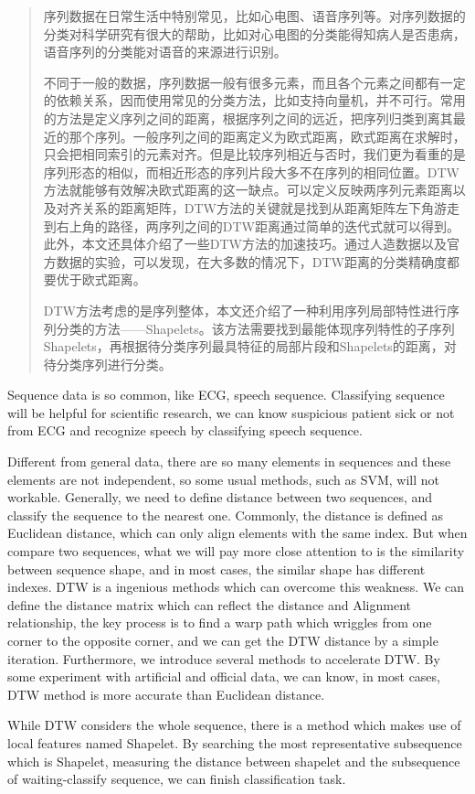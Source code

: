 \begin{abstract}

    序列数据在日常生活中特别常见，比如心电图、语音序列等。对序列数据的分类对科学研究有很大的帮助，比如对心电图的分类能得知病人是否患病，语音序列的分类能对语音的来源进行识别。

    不同于一般的数据，序列数据一般有很多元素，而且各个元素之间都有一定的依赖关系，因而使用常见的分类方法，比如支持向量机，并不可行。常用的方法是定义序列之间的距离，根据序列之间的远近，把序列归类到离其最近的那个序列。一般序列之间的距离定义为欧式距离，欧式距离在求解时，只会把相同索引的元素对齐。但是比较序列相近与否时，我们更为看重的是序列形态的相似，而相近形态的序列片段大多不在序列的相同位置。DTW方法就能够有效解决欧式距离的这一缺点。可以定义反映两序列元素距离以及对齐关系的距离矩阵，DTW方法的关键就是找到从距离矩阵左下角游走到右上角的路径，两序列之间的DTW距离通过简单的迭代式就可以得到。此外，本文还具体介绍了一些DTW方法的加速技巧。通过人造数据以及官方数据的实验，可以发现，在大多数的情况下，DTW距离的分类精确度都要优于欧式距离。

    DTW方法考虑的是序列整体，本文还介绍了一种利用序列局部特性进行序列分类的方法——Shapelets。该方法需要找到最能体现序列特性的子序列Shapelets，再根据待分类序列最具特征的局部片段和Shapelets的距离，对待分类序列进行分类。

\end{abstract}

\begin{enabstract}
  Sequence data is so common, like ECG, speech sequence. Classifying sequence will be helpful for scientific research, we can know suspicious patient sick or not from ECG and recognize speech by classifying speech sequence.

  Different from general data, there are so many elements in sequences and these elements are not independent, so some usual methods, such as SVM, will not workable. Generally, we need to define distance between two sequences, and classify the sequence to the nearest one. Commonly, the distance is defined as Euclidean distance, which can only align elements with the same index. But when compare two sequences, what we will pay more close attention to is the similarity between sequence shape, and in most cases, the similar shape has different indexes. DTW is a ingenious methods which can overcome this weakness. We can define the distance matrix which can reflect the distance and Alignment relationship, the key process is to find a warp path which wriggles from one corner to the opposite corner, and we can get the DTW distance by a simple iteration. Furthermore, we introduce several methods to accelerate DTW. By some experiment with artificial and official data, we can know, in most cases, DTW method is more accurate than Euclidean distance.

  While DTW considers the whole sequence, there is a method which makes use of local features named Shapelet. By searching the most representative subsequence which is Shapelet, measuring the distance between shapelet and the subsequence of waiting-classify sequence, we can finish classification task.
\end{enabstract}
